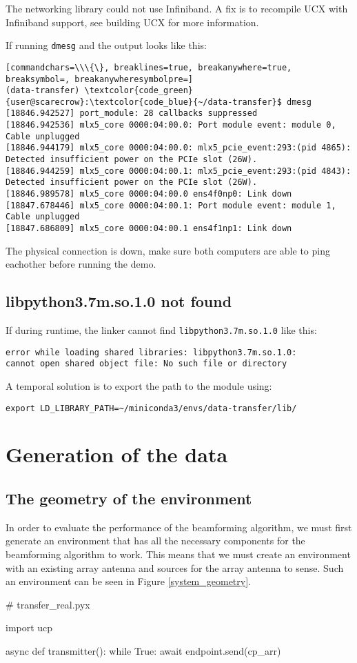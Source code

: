 \documentclass[a4paper,onecolumn]{article}
\begin{document}
The networking library could not use Infiniband. A fix is to recompile UCX with Infiniband support, see building UCX for more information. 

If running \verb|dmesg| and the output looks like this:

\begin{Verbatim}[commandchars=\\\{\}, breaklines=true, breakanywhere=true, breaksymbol=, breakanywheresymbolpre=]
(data-transfer) \textcolor{code_green}{user@scarecrow}:\textcolor{code_blue}{~/data-transfer}$ dmesg
[18846.942527] port_module: 28 callbacks suppressed
[18846.942536] mlx5_core 0000:04:00.0: Port module event: module 0, Cable unplugged
[18846.944179] mlx5_core 0000:04:00.0: mlx5_pcie_event:293:(pid 4865): Detected insufficient power on the PCIe slot (26W).
[18846.944259] mlx5_core 0000:04:00.1: mlx5_pcie_event:293:(pid 4843): Detected insufficient power on the PCIe slot (26W).
[18846.989578] mlx5_core 0000:04:00.0 ens4f0np0: Link down
[18847.678446] mlx5_core 0000:04:00.1: Port module event: module 1, Cable unplugged
[18847.686809] mlx5_core 0000:04:00.1 ens4f1np1: Link down
\end{Verbatim}

The physical connection is down, make sure both computers are able to ping eachother before running the demo.


\subsection{libpython3.7m.so.1.0 not found}
If during runtime, the linker cannot find \verb|libpython3.7m.so.1.0| like this:
\begin{verbatim}
error while loading shared libraries: libpython3.7m.so.1.0: 
cannot open shared object file: No such file or directory
\end{verbatim}

A temporal solution is to export the path to the module using:
\begin{verbatim}
export LD_LIBRARY_PATH=~/miniconda3/envs/data-transfer/lib/
\end{verbatim}


\section{Generation of the data}
\subsection{The geometry of the environment}
In order to evaluate the performance of the beamforming algorithm, we must first generate an environment that has all the necessary components for the beamforming algorithm to work. This means that we must create an environment with an existing array antenna and sources for the array antenna to sense. Such an environment can be seen in Figure \ref{system_geometry}.

\begin{python}
# transfer_real.pyx

import ucp

async def transmitter():
    while True:
        await endpoint.send(cp_arr)
\end{python}




\end{document}
